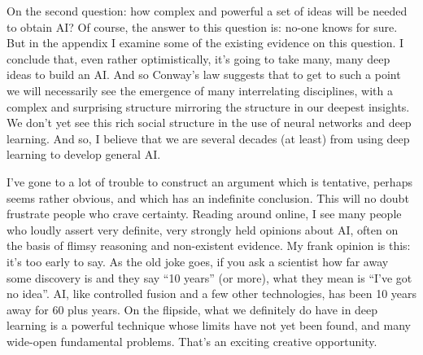 \documentclass[a4paper,twoside,10pt]{book}
\begin{document}
On the second question: how complex and powerful a set of ideas will be needed to obtain AI? Of course, the answer to this question is: no-one knows for sure. But in the appendix I examine some of the existing evidence on this question. I conclude that, even rather optimistically, it's going to take many, many deep ideas to build an AI. And so Conway's law suggests that to get to such a point we will necessarily see the emergence of many interrelating disciplines, with a complex and surprising structure mirroring the structure in our deepest insights. We don't yet see this rich social structure in the use of neural networks and deep learning. And so, I believe that we are several decades (at least) from using deep learning to develop general AI.

I've gone to a lot of trouble to construct an argument which is tentative, perhaps seems rather obvious, and which has an indefinite conclusion. This will no doubt frustrate people who crave certainty. Reading around online, I see many people who loudly assert very definite, very strongly held opinions about AI, often on the basis of flimsy reasoning and non-existent evidence. My frank opinion is this: it's too early to say. As the old joke goes, if you ask a scientist how far away some discovery is and they say ``10 years'' (or more), what they mean is ``I've got no idea''. AI, like controlled fusion and a few other technologies, has been 10 years away for 60 plus years. On the flipside, what we definitely do have in deep learning is a powerful technique whose limits have not yet been found, and many wide-open fundamental problems. That's an exciting creative opportunity.
\end{document}
